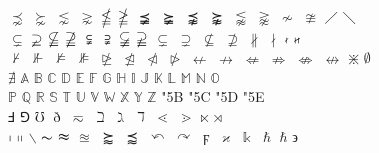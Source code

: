 \documentclass{article}
\begin{document}
$\precnsim$ $\succnsim$ $\lnsim$ $\gnsim$ $\nleqq$ $\ngeqq$ $\precneqq$ $\succneqq$ $\precnapprox$ $\succnapprox$ $\lnapprox$ $\gnapprox$ $\nsim$ $\ncong$ $\diagup$ $\diagdown$\\
$\varsubsetneq$ $\varsupsetneq$ $\nsubseteqq$ $\nsupseteqq$ $\subsetneqq$ $\supsetneqq$ $\varsubsetneqq$ $\varsupsetneqq$ $\subsetneq$ $\supsetneq$ $\nsubseteq$ $\nsupseteq$ $\nparallel$ $\nmid$ $\nshortmid$ $\nshortparallel$\\
$\nvdash$ $\nVdash$ $\nvDash$ $\nVDash$ $\ntrianglerighteq$ $\ntrianglelefteq$ $\ntriangleleft$ $\ntriangleright$ $\nleftarrow$ $\nrightarrow$ $\nLeftarrow$ $\nRightarrow$ $\nLeftrightarrow$ $\nleftrightarrow$ $\divideontimes$ $\emptyset$\\
$\nexists$ $\mathbb{A}$ $\mathbb{B}$ $\mathbb{C}$ $\mathbb{D}$ $\mathbb{E}$ $\mathbb{F}$ $\mathbb{G}$ $\mathbb{H}$ $\mathbb{I}$ $\mathbb{J}$ $\mathbb{K}$ $\mathbb{L}$ $\mathbb{M}$ $\mathbb{N}$ $\mathbb{O}$\\
$\mathbb{P}$ $\mathbb{Q}$ $\mathbb{R}$ $\mathbb{S}$ $\mathbb{T}$ $\mathbb{U}$ $\mathbb{V}$ $\mathbb{W}$ $\mathbb{X}$ $\mathbb{Y}$ $\mathbb{Z}$ \selectfont\char"5B \selectfont\char"5C \selectfont\char"5D \selectfont\char"5E \\
$\Finv$ $\Game$ $\mho$ $\eth$ $\eqsim$ $\beth$ $\gimel$ $\daleth$ $\lessdot$ $\gtrdot$ $\ltimes$ $\rtimes$\\
$\shortmid$ $\shortparallel$ $\smallsetminus$ $\thicksim$ $\thickapprox$ $\approxeq$ $\succapprox$ $\precapprox$ $\curvearrowleft$ $\curvearrowright$ $\digamma$ $\varkappa$ $\Bbbk$ $\hslash$ $\hbar$ $\backepsilon$\\
\end{document}
